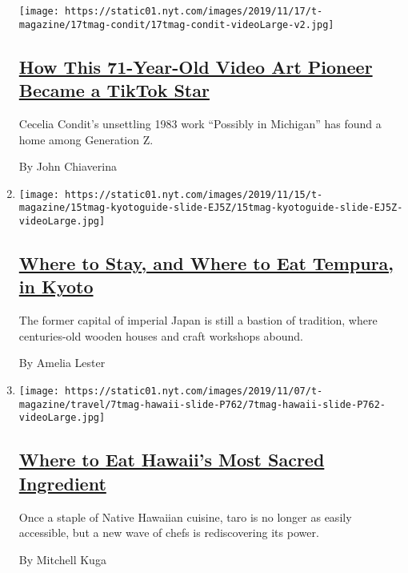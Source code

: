 \begin{enumerate}
  \texttt{[image: https://static01.nyt.com/images/2019/11/17/t-magazine/17tmag-condit/17tmag-condit-videoLarge-v2.jpg]}

  \hypertarget{how-this-71-year-old-video-art-pioneer-became-a-tiktok-star}{%
  \subsection{\texorpdfstring{\href{/2019/11/06/t-magazine/possibly-in-michigan-tiktok-artist.html}{How
  This 71-Year-Old Video Art Pioneer Became a TikTok
  Star}}{How This 71-Year-Old Video Art Pioneer Became a TikTok Star}}\label{how-this-71-year-old-video-art-pioneer-became-a-tiktok-star}}

  Cecelia Condit's unsettling 1983 work ``Possibly in Michigan'' has
  found a home among Generation Z.

  By John Chiaverina
\item
  \texttt{[image: https://static01.nyt.com/images/2019/11/15/t-magazine/15tmag-kyotoguide-slide-EJ5Z/15tmag-kyotoguide-slide-EJ5Z-videoLarge.jpg]}

  \hypertarget{where-to-stay-and-where-to-eat-tempura-in-kyoto}{%
  \subsection{\texorpdfstring{\href{/2019/11/18/t-magazine/kyoto-japan-travel-guide.html}{Where
  to Stay, and Where to Eat Tempura, in
  Kyoto}}{Where to Stay, and Where to Eat Tempura, in Kyoto}}\label{where-to-stay-and-where-to-eat-tempura-in-kyoto}}

  The former capital of imperial Japan is still a bastion of tradition,
  where centuries-old wooden houses and craft workshops abound.

  By Amelia Lester
\item
  \texttt{[image: https://static01.nyt.com/images/2019/11/07/t-magazine/travel/7tmag-hawaii-slide-P762/7tmag-hawaii-slide-P762-videoLarge.jpg]}

  \hypertarget{where-to-eat-hawaiis-most-sacred-ingredient}{%
  \subsection{\texorpdfstring{\href{/2019/11/08/t-magazine/hawaii-restaurants.html}{Where
  to Eat Hawaii's Most Sacred
  Ingredient}}{Where to Eat Hawaii's Most Sacred Ingredient}}\label{where-to-eat-hawaiis-most-sacred-ingredient}}

  Once a staple of Native Hawaiian cuisine, taro is no longer as easily
  accessible, but a new wave of chefs is rediscovering its power.

  By Mitchell Kuga
\end{enumerate}

